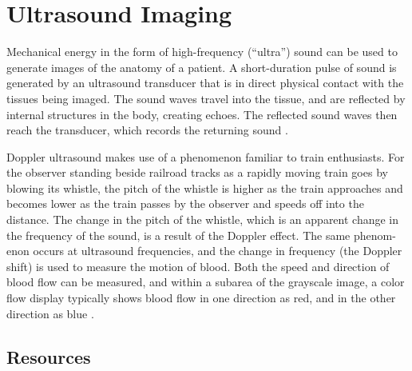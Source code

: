 \chapter{Ultrasound Imaging}

Mechanical
energy in the form of high-frequency (“ultra”) sound can be used to generate images
of the anatomy of a patient. A short-duration pulse of sound is generated by an
ultrasound transducer that is in direct physical contact with the tissues being imaged.
The sound waves travel into the tissue, and are reflected by internal structures in the
body, creating echoes. The reflected sound waves then reach the transducer, which
records the returning sound \cite{bushberg2011essential}.

Doppler ultrasound makes use of a phenomenon familiar to train enthusiasts.
For the observer standing beside railroad tracks as a rapidly moving train goes
by blowing its whistle, the pitch of the whistle is higher as the train approaches
and becomes lower as the train passes by the observer and speeds off into the
distance. The change in the pitch of the whistle, which is an apparent change in
the frequency of the sound, is a result of the Doppler effect. The same phenom-
enon occurs at ultrasound frequencies, and the change in frequency (the Doppler
shift) is used to measure the motion of blood. Both the speed and direction of
blood flow can be measured, and within a subarea of the grayscale image, a color
flow display typically shows blood flow in one direction as red, and in the other
direction as blue \cite{bushberg2011essential}.

\section{Resources}


